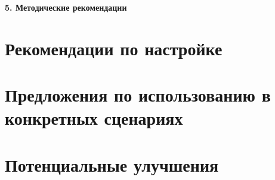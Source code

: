 \newpage
\begin{center}
  \textbf{\large 5. Методические рекомендации}
\end{center}

\section{Рекомендации по настройке}
\section{Предложения по использованию в конкретных сценариях}
\section{Потенциальные улучшения}